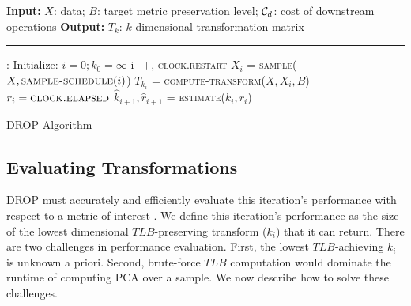 
\begin{algorithm}[t!]
\begin{algorithmic}[1]
\small
\Statex \textbf{Input:}  $X$: data; $B$: target metric preservation level; $\mathcal{C}_{\color{black}d}$: cost of downstream operations
\Statex \textbf{Output:} $T_k$: $k$-dimensional transformation matrix
\Statex
\Statex \hrule
{}:
	\State Initialize: $i = 0; k_0 = \infty$ 
	\Do
		\State i$\texttt{++}$, \textsc{clock.restart}
		\State $X_i$ = \textsc{sample}($X, \textsc{sample-schedule}(i)$) \label{eq:sample}
			\Comment{\S~\ref{subsec:psample}}
		\State $T_{k_i}$ = \textsc{compute-transform}($X, X_i,  B$) \label{eq:evaluate}
			\Comment{\S~\ref{subsec:teval}}
		\State $r_i = \textsc{clock.elapsed}$	
		\State $\hat{k}_{i+1}, \hat{r}_{i+1} $ = \textsc{estimate}($k_i, r_i$) \label{eq:estimate}
			\Comment{\S~\ref{subsec:pest}}
	 \label{eq:optimize}
		\Comment{\S~\ref{subsec:opt}}
	\\
\EndFunction
\end{algorithmic}
\caption{DROP Algorithm}
\label{alg:DROP}
\end{algorithm}



\subsection{Evaluating Transformations}
\label{subsec:teval}
DROP must accurately and efficiently evaluate this iteration's performance with respect to a metric of interest . 
We define this iteration's performance as the size of the lowest dimensional $TLB$-preserving transform ($k_i$) that it can return. 
There are two challenges in performance evaluation.
First, the lowest $TLB$-achieving $k_i$ is unknown a priori. 
Second, brute-force $TLB$ computation would dominate the runtime of computing PCA over a sample. 
We now describe how to solve these challenges.

